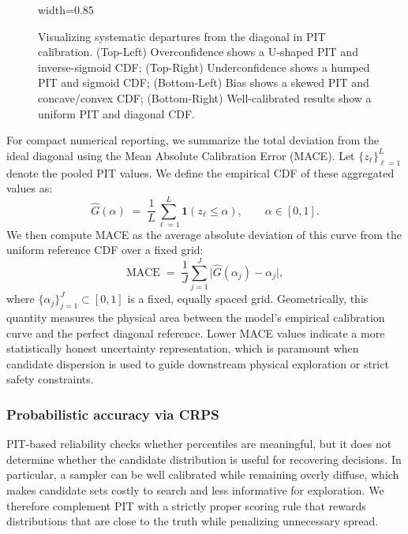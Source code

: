 \begin{figure}[!htbp]
  \centering
  \begin{adjustbox}{width=0.85\linewidth}
      
  \end{adjustbox}
  \caption[Interpretive Signatures of PIT Calibration Curves]{Visualizing systematic departures from the diagonal in PIT calibration. (Top-Left) Overconfidence shows a U-shaped PIT and inverse-sigmoid CDF; (Top-Right) Underconfidence shows a humped PIT and sigmoid CDF; (Bottom-Left) Bias shows a skewed PIT and concave/convex CDF; (Bottom-Right) Well-calibrated results show a uniform PIT and diagonal CDF.}
  \label{fig:pit_signatures}
\end{figure}

For compact numerical reporting, we summarize the total deviation from the ideal diagonal using the Mean Absolute Calibration Error (MACE). Let $\{z_\ell\}_{\ell=1}^{L}$ denote the pooled PIT values. We define the empirical CDF of these aggregated values as:
\begin{equation}
  \widehat{G}(\alpha)
  \;=\;
  \frac{1}{L}\sum_{\ell=1}^{L}\mathbf{1}\!\left(z_\ell \le \alpha\right),
  \qquad \alpha\in[0,1].
  \label{eq:pit_ecdf}
\end{equation}
We then compute MACE as the average absolute deviation of this curve from the uniform reference CDF over a fixed grid: 
\begin{equation}
  \mathrm{MACE}
  \;=\;
  \frac{1}{J}\sum_{j=1}^{J}\big|\widehat{G}(\alpha_j)-\alpha_j\big|,
  \label{eq:mace}
\end{equation}
where $\{\alpha_j\}_{j=1}^{J}\subset[0,1]$ is a fixed, equally spaced grid. Geometrically, this quantity measures the physical area between the model's empirical calibration curve and the perfect diagonal reference. Lower MACE values indicate a more statistically honest uncertainty representation, which is paramount when candidate dispersion is used to guide downstream physical exploration or strict safety constraints.



\subsubsection{Probabilistic accuracy via CRPS}\label{sec:eval_crps}

PIT-based reliability checks whether percentiles are meaningful, but it does not determine
whether the candidate distribution is useful for recovering decisions. In particular, a
sampler can be well calibrated while remaining overly diffuse, which makes candidate sets
costly to search and less informative for exploration. We therefore complement PIT with a
strictly proper scoring rule that rewards distributions that are close to the truth while
penalizing unnecessary spread. \cite{GneitingRaftery2007}

